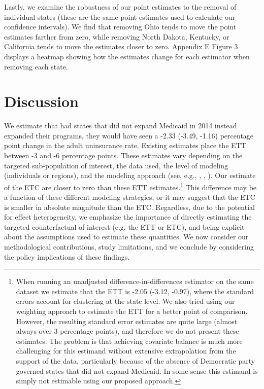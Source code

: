 \documentclass[aoas]{imsart}
\theoremstyle{plain}
\theoremstyle{remark}
\begin{document}
Lastly, we examine the robustness of our point estimates to the removal of individual states (these are the same point estimates used to calculate our confidence intervals). We find that removing Ohio tends to move the point estimates farther from zero, while removing North Dakota, Kentucky, or California tends to move the estimates closer to zero. Appendix E Figure 3 displays a heatmap showing how the estimates change for each estimator when removing each state.

\section{Discussion}

We estimate that had states that did not expand Medicaid in 2014 instead expanded their programs, they would have seen a -2.33 (-3.49, -1.16) percentage point change in the adult uninsurance rate. Existing estimates place the ETT between -3 and -6 percentage points. These estimates vary depending on the targeted sub-population of interest, the data used, the level of modeling (individuals or regions), and the modeling approach (see, e.g., \cite{courtemanche2017early}, \cite{kaestner2017effects}, \cite{frean2017premium}). Our estimate of the ETC are closer to zero than these ETT estimates.\footnote{When running an unadjusted difference-in-differences estimator on the same dataset we estimate that the ETT is -2.05 (-3.12, -0.97), where the standard errors account for clustering at the state level. We also tried using our weighting approach to estimate the ETT for a better point of comparison. However, the resulting standard error estimates are quite large (almost always over 3 percentage points), and therefore we do not present these estimates. The problem is that achieving covariate balance is much more challenging for this estimand without extensive extrapolation from the support of the data, particularly because of the absence of Democratic party governed states that did not expand Medicaid. In some sense this estimand is simply not estimable using our proposed approach.} This difference may be a function of these different modeling strategies, or it may suggest that the ETC is smaller in absolute magnitude than the ETC. Regardless, due to the potential for effect heterogeneity, we emphasize the importance of directly estimating the targeted counterfactual of interest (e.g. the ETT or ETC), and being explicit about the assumptions used to estimate these quantities. We now consider our methodological contributions, study limitations, and we conclude by considering the policy implications of these findings.
\end{document}

